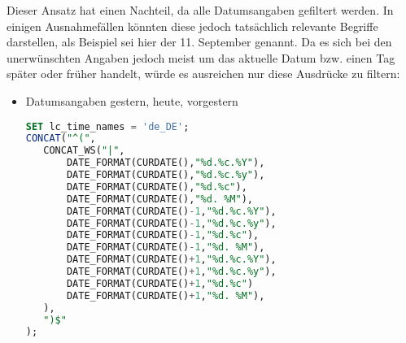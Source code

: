 Dieser Ansatz hat einen Nachteil, da alle Datumsangaben gefiltert werden. In einigen Ausnahmefällen könnten diese jedoch tatsächlich relevante Begriffe darstellen, als Beispiel sei hier der 11. September genannt. Da es sich bei den unerwünschten Angaben jedoch meist um das aktuelle Datum bzw. einen Tag später oder früher handelt, würde es ausreichen nur diese Ausdrücke zu filtern: 

\begin{itemize}
	\item{Datumsangaben gestern, heute, vorgestern}\\
	\begin{lstlisting}[language=sql]
SET lc_time_names = 'de_DE';
CONCAT("^(",
   CONCAT_WS("|",
       DATE_FORMAT(CURDATE(),"%d.%c.%Y"),
       DATE_FORMAT(CURDATE(),"%d.%c.%y"),
       DATE_FORMAT(CURDATE(),"%d.%c"),
       DATE_FORMAT(CURDATE(),"%d. %M"),
       DATE_FORMAT(CURDATE()-1,"%d.%c.%Y"),
       DATE_FORMAT(CURDATE()-1,"%d.%c.%y"),
       DATE_FORMAT(CURDATE()-1,"%d.%c"),
       DATE_FORMAT(CURDATE()-1,"%d. %M"),
       DATE_FORMAT(CURDATE()+1,"%d.%c.%Y"),
       DATE_FORMAT(CURDATE()+1,"%d.%c.%y"),
       DATE_FORMAT(CURDATE()+1,"%d.%c")
       DATE_FORMAT(CURDATE()+1,"%d. %M"),
   ),
   ")$"
);
	\end{lstlisting}
\end{itemize}